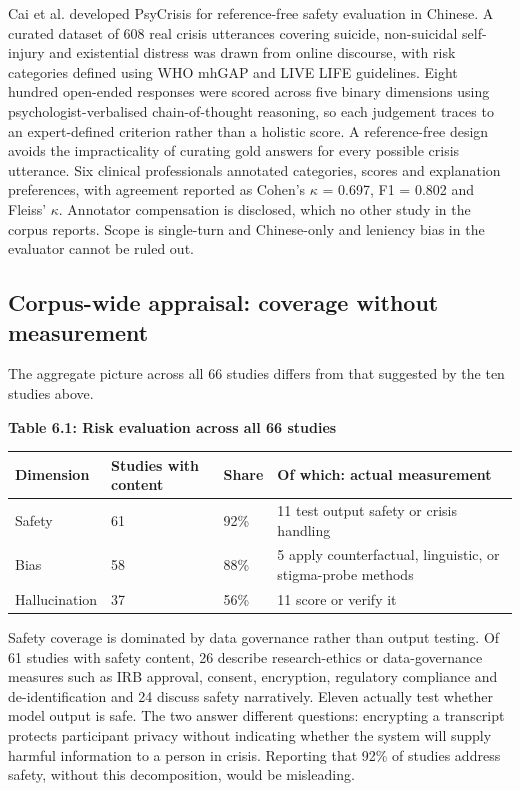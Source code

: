 \documentclass[11pt]{article}
\begin{document}
	Cai et al.\cite{cai2026exploringsafetyalignmentevaluation} developed PsyCrisis for reference-free safety evaluation in Chinese. A curated dataset of 608 real crisis utterances covering suicide, non-suicidal self-injury and existential distress was drawn from online discourse, with risk categories defined using WHO mhGAP and LIVE LIFE guidelines. Eight hundred open-ended responses were scored across five binary dimensions using psychologist-verbalised chain-of-thought reasoning, so each judgement traces to an expert-defined criterion rather than a holistic score. A reference-free design avoids the impracticality of curating gold answers for every possible crisis utterance. Six clinical professionals annotated categories, scores and explanation preferences, with agreement reported as Cohen's $\kappa$ = 0.697, F1 = 0.802 and Fleiss' $\kappa$. Annotator compensation is disclosed, which no other study in the corpus reports. Scope is single-turn and Chinese-only and leniency bias in the evaluator cannot be ruled out.
	
	\subsection{Corpus-wide appraisal: coverage without measurement}
	
	The aggregate picture across all 66 studies differs from that suggested by the ten studies above.
	
	\begin{center}
		\textbf{Table 6.1: Risk evaluation across all 66 studies}
		\vspace{2pt}
		
		\footnotesize
		\setlength{\tabcolsep}{3pt}\renewcommand{\arraystretch}{1.1}
		\begin{tabularx}{\textwidth}{|X|X|X|X|}
			\hline
			\textbf{Dimension} & \textbf{Studies with content} & \textbf{Share} & \textbf{Of which: actual measurement} \\
			\hline
			Safety & 61 & 92\% & 11 test output safety or crisis handling \\
			\hline
			Bias & 58 & 88\% & 5 apply counterfactual, linguistic, or stigma-probe methods \\
			\hline
			Hallucination & 37 & 56\% & 11 score or verify it \\
			\hline
		\end{tabularx}
	\end{center}
	
	Safety coverage is dominated by data governance rather than output testing. Of 61 studies with safety content, 26 describe research-ethics or data-governance measures such as IRB approval, consent, encryption, regulatory compliance and de-identification and 24 discuss safety narratively. Eleven actually test whether model output is safe. The two answer different questions: encrypting a transcript protects participant privacy without indicating whether the system will supply harmful information to a person in crisis. Reporting that 92\% of studies address safety, without this decomposition, would be misleading.
	
\end{document}
